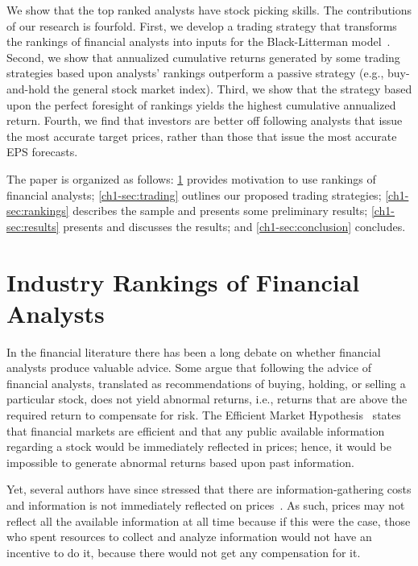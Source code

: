 \documentclass[a4paper,twoside,12pt,openright,notitlepage]{report}\usepackage[]{graphicx}\usepackage[]{color}
\begin{document}
We show that the top ranked analysts have stock picking skills. The contributions of our research is fourfold. First, we develop a trading strategy that transforms the rankings of financial analysts into inputs for the Black-Litterman model~\citep{black1992}. Second, we show that annualized cumulative returns generated by some trading strategies  based upon analysts' rankings outperform a passive strategy (e.g., buy-and-hold the general stock market index). Third, we show that the strategy based upon the perfect foresight of rankings yields the highest cumulative annualized return. Fourth, we find that investors  are better off following analysts that issue the most accurate target prices, rather than those that issue the most accurate EPS forecasts.



The paper is organized as follows: \ref{ch1-sec:ranking} provides motivation to use rankings of financial analysts; \ref{ch1-sec:trading} outlines our proposed  trading strategies; \ref{ch1-sec:rankings} describes the sample and presents some preliminary results; \ref{ch1-sec:results} presents and discusses the results; and \ref{ch1-sec:conclusion} concludes.

\section{Industry Rankings of Financial Analysts}
\label{ch1-sec:ranking}

In the financial literature there has been a long debate on whether financial analysts produce valuable  advice. Some argue that following the advice of financial analysts,  translated as recommendations of buying, holding, or selling a particular stock, does not yield  abnormal returns, i.e.,  returns that are above the required return to compensate for risk. The Efficient Market Hypothesis~\citep{fama1970ecm} states that financial markets are efficient and that any public available information  regarding a stock would be immediately reflected in prices; hence, it would be  impossible to generate abnormal returns based upon past information.

Yet, several authors have since stressed that  there are information-gathering costs and information is not immediately reflected on prices~\citep{grossman1980iie}. As such, prices may not  reflect all the available information at all time because if this were the case, those who spent resources to collect and analyze   information would not have an incentive to do it, because there would not get any compensation for it.
\end{document}
